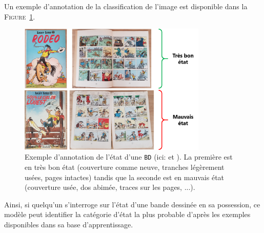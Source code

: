 			Un exemple d'annotation de la classification de l'image est disponible dans la \textsc{Figure~\ref{figure:2.1.2.B-PRESENTATION-ANNOTATION-EXEMPLES-CLASSIFICATION}}.
			\begin{leftBarExamples}
				\begin{figure}[H]
					\centering
					\includegraphics[width=0.80\textwidth]{figures/etatdelart-morris-1950-lucky-luke-2-1952-lucky-luke-4}
					\caption{
						Exemple d'annotation de l'état d'une \texttt{BD} (ici: \cite{morris-goscinny:1950:rodeo} et \cite{morris-goscinny:1952:sous-ciel-ouest}).
						La première est en très bon état (couverture comme neuve, tranches légèrement usées, pages intactes) tandis que la seconde est en mauvais état (couverture usée, dos abimée, traces sur les pages, ...).
					}
					\label{figure:2.1.2.B-PRESENTATION-ANNOTATION-EXEMPLES-CLASSIFICATION}
				\end{figure}
			\end{leftBarExamples}
			
			Ainsi, si quelqu'un s'interroge sur l'état d'une bande dessinée en sa possession, ce modèle peut identifier la catégorie d'état la plus probable d'après les exemples disponibles dans sa base d'apprentissage.
			
